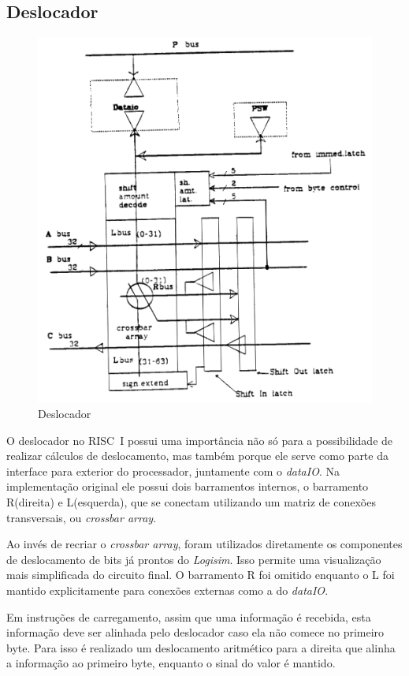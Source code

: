 \documentclass[
	article,			%
	11pt,				%
	oneside,			%
	a4paper,			%
	english,			%
	brazil,				%
	sumario=tradicional
	]{abntex2}
\begin{document}
\subsection{Deslocador}
\begin{figure}[H]
    \centering
    \includegraphics[width=0.75\linewidth]{Original/shifterPeek.png}
    \caption{Deslocador\cite{peek_vlsi_1983}}
    \label{fig:shifterPeek}
\end{figure}
O deslocador no RISC~I possui uma importância não só para a possibilidade de realizar cálculos de deslocamento, mas também porque ele serve como parte da interface para exterior do processador, juntamente com o \textit{dataIO}. Na implementação original ele possui dois barramentos internos, o barramento R(direita) e L(esquerda), que se conectam utilizando um matriz de conexões transversais, ou \textit{crossbar array}.

Ao invés de recriar o \textit{crossbar array}, foram utilizados diretamente os componentes de deslocamento de bits já prontos do \textit{Logisim}. Isso permite uma visualização mais simplificada do circuito final. O barramento R foi omitido enquanto o L foi mantido explicitamente para conexões externas como a do \textit{dataIO}.

Em instruções de carregamento, assim que uma informação é recebida, esta informação deve ser alinhada pelo deslocador caso ela não comece no primeiro byte. Para isso é realizado um deslocamento aritmético para a direita que alinha a informação ao primeiro byte, enquanto o sinal do valor é mantido.
\end{document}
